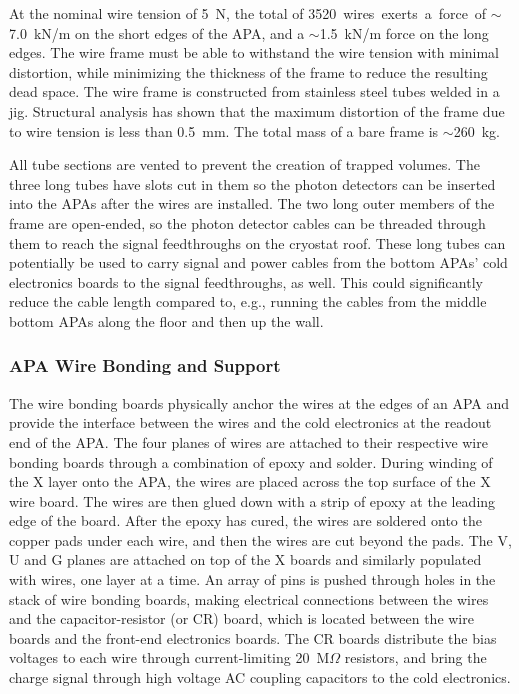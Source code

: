 At the nominal wire tension of 5~N, the total of \SI{3520} wires exerts a
force of $\sim$7.0~kN/m on the short edges of the APA, and a
$\sim$1.5~kN/m force on the long edges. The wire frame must be able to
withstand the wire tension with minimal distortion, while minimizing
the thickness of the frame to reduce the resulting dead space.  The
wire frame is constructed from stainless steel tubes welded in a
jig.  Structural analysis has shown that the maximum distortion of the
frame due to wire tension is less than 0.5~mm. The total mass of a
bare frame is $\sim$260~kg.


All tube sections are vented to prevent the creation of trapped
volumes.  The three long tubes have slots cut in them so the photon
detectors can be inserted into the APAs after the wires are installed. 
The two long outer members of the frame are open-ended, so the photon
detector cables can be threaded through them to reach the signal
feedthroughs on the cryostat roof.  These long tubes can potentially
be used to carry signal and power cables from the bottom APAs' cold
electronics boards to the signal feedthroughs, as well.  This could significantly 
reduce the cable length %
compared to, e.g.,
running the cables from the middle bottom APAs %
along the floor and then up the wall.


\subsubsection{APA Wire Bonding and Support}
\label{subsec:fd-ref-wirewrap}


The wire bonding boards physically anchor the wires at the edges of an
APA and provide the interface between the wires and the cold
electronics at the readout end of the APA.  The four planes of wires
are attached to their respective wire bonding boards through a
combination of epoxy and solder. During winding of the X layer onto
the APA, the wires are placed across the top surface of the X wire
board. The wires are then glued down with a strip of epoxy at the
leading edge of the board.  After the epoxy has cured, the wires are
soldered onto the copper pads under each wire, and then the wires are
cut beyond the pads. The V, U and G planes are attached on top of the
X boards and similarly populated with wires, one layer at a time. An
array of pins is pushed through holes in the stack of wire bonding
boards, making electrical connections between the wires and the
capacitor-resistor (or CR) board, which is located between the wire
boards and the front-end electronics boards.  The CR boards distribute
the bias voltages to each wire through current-limiting 20~M$\Omega$
resistors, and bring the charge signal through high voltage AC
coupling capacitors to the cold electronics.

